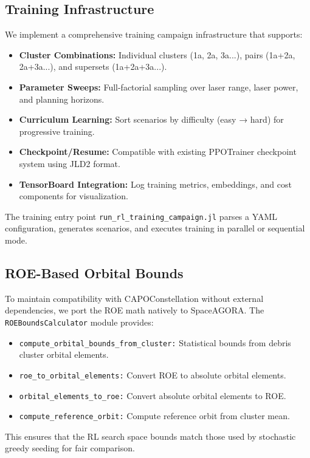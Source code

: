 \subsection{Training Infrastructure}

We implement a comprehensive training campaign infrastructure that supports:

\begin{itemize}
    \item \textbf{Cluster Combinations:} Individual clusters (1a, 2a, 3a...), pairs (1a+2a, 2a+3a...), and supersets (1a+2a+3a...).
    \item \textbf{Parameter Sweeps:} Full-factorial sampling over laser range, laser power, and planning horizons.
    \item \textbf{Curriculum Learning:} Sort scenarios by difficulty (easy → hard) for progressive training.
    \item \textbf{Checkpoint/Resume:} Compatible with existing PPOTrainer checkpoint system using JLD2 format.
    \item \textbf{TensorBoard Integration:} Log training metrics, embeddings, and cost components for visualization.
\end{itemize}

The training entry point \texttt{run\_rl\_training\_campaign.jl} parses a YAML configuration, generates scenarios, and executes training in parallel or sequential mode.

\subsection{ROE-Based Orbital Bounds}

To maintain compatibility with CAPOConstellation without external dependencies, we port the ROE math natively to SpaceAGORA. The \texttt{ROEBoundsCalculator} module provides:

\begin{itemize}
    \item \texttt{compute\_orbital\_bounds\_from\_cluster:} Statistical bounds from debris cluster orbital elements.
    \item \texttt{roe\_to\_orbital\_elements:} Convert ROE to absolute orbital elements.
    \item \texttt{orbital\_elements\_to\_roe:} Convert absolute orbital elements to ROE.
    \item \texttt{compute\_reference\_orbit:} Compute reference orbit from cluster mean.
\end{itemize}

This ensures that the RL search space bounds match those used by stochastic greedy seeding for fair comparison.
